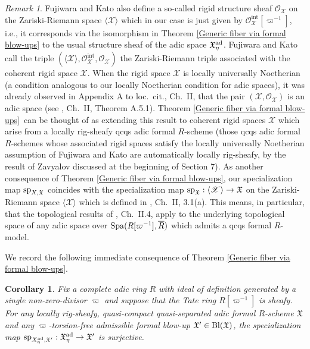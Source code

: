 \documentclass[12pt,twoside,a4paper]{article}
\newtheorem{cor}[thm]{Corollary}
\theoremstyle{definition}
\theoremstyle{remark}
\newtheorem{rmk}[thm]{Remark}
\newcommand\ad{{\rm ad}}
\newcommand\Bl{{\rm Bl}}
\newcommand\spc{{\rm sp}}
\newcommand\Spa{{\rm Spa}}
\begin{document}
\begin{rmk}
Fujiwara and Kato also define a so-called rigid structure sheaf $\mathcal{O}_{\mathscr{X}}$ on the Zariski-Riemann space $\langle\mathscr{X}\rangle$ which in our case is just given by $\mathcal{O}_{\mathscr{X}}^{\textrm{int}}[\varpi^{-1}]$, i.e., it corresponds via the isomorphism in Theorem \ref{Generic fiber via formal blow-ups} to the usual structure sheaf of the adic space $\mathfrak{X}_{\eta}^{\ad}$. Fujiwara and Kato call the triple $(\langle\mathscr{X}\rangle, \mathcal{O}_{\mathscr{X}}^{\textrm{int}}, \mathcal{O}_{\mathscr{X}})$ the Zariski-Riemann triple associated with the coherent rigid space $\mathscr{X}$. When the rigid space $\mathscr{X}$ is locally universally Noetherian (a condition analogous to our locally Noetherian condition for adic spaces), it was already observed in Appendix A to loc.~cit., Ch.~II, that the pair $(\mathscr{X}, \mathcal{O}_{\mathscr{X}})$ is an adic space (see \cite{FK}, Ch.~II, Theorem A.5.1). Theorem \ref{Generic fiber via formal blow-ups} can be thought of as extending this result to coherent rigid spaces $\mathscr{X}$ which arise from a locally rig-sheafy qcqs adic formal $R$-scheme (those qcqs adic formal $R$-schemes whose associated rigid spaces satisfy the locally universally Noetherian assumption of Fujiwara and Kato are automatically locally rig-sheafy, by the result of Zavyalov discussed at the beginning of Section 7). As another consequence of Theorem \ref{Generic fiber via formal blow-ups}, our specialization map $\spc_{X,\mathfrak{X}}$ coincides with the specialization map $\spc_{\mathfrak{X}}: \langle\mathscr{X}\rangle\to\mathfrak{X}$ on the Zariski-Riemann space $\langle\mathscr{X}\rangle$ which is defined in \cite{FK}, Ch.~II, 3.1(a). This means, in particular, that the topological results of \cite{FK}, Ch.~II.4, apply to the underlying topological space of any adic space over $\Spa(R[\varpi^{-1}], \overline{R})$ which admits a qcqs formal $R$-model.\end{rmk}   
We record the following immediate consequence of Theorem \ref{Generic fiber via formal blow-ups}.
\begin{cor}\label{Center maps are surjective}Fix a complete adic ring $R$ with ideal of definition generated by a single non-zero-divisor $\varpi$ and suppose that the Tate ring $R[\varpi^{-1}]$ is sheafy. For any locally rig-sheafy, quasi-compact quasi-separated adic formal $R$-scheme $\mathfrak{X}$ and any $\varpi$-torsion-free admissible formal blow-up $\mathfrak{X}'\in\Bl(\mathfrak{X})$, the specialization map $\spc_{X_{\eta}^{\ad},\mathfrak{X}'}: \mathfrak{X}_{\eta}^{\ad}\to \mathfrak{X}'$ is surjective.\end{cor}
\end{document}

